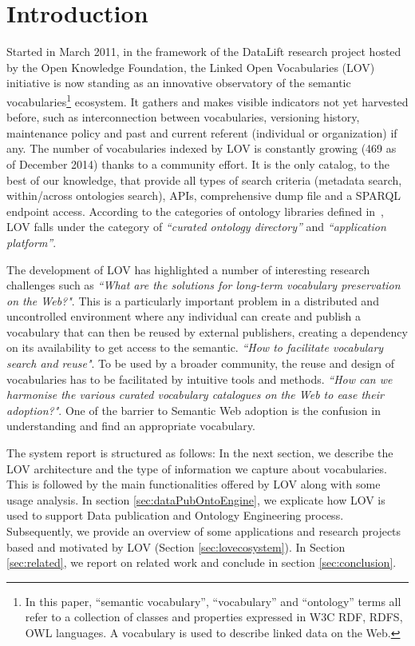 \documentclass{iosart2c}
\begin{document}
\section{Introduction}
Started in March 2011, in the framework of the DataLift research project \cite{scharffe_2012} hosted by the Open Knowledge Foundation, the Linked Open Vocabularies (LOV) initiative is now standing as an innovative observatory of the semantic vocabularies\footnote{In this paper, ``semantic vocabulary'', ``vocabulary'' and ``ontology'' terms all refer to a collection of classes and properties expressed in W3C RDF, RDFS, OWL languages. A vocabulary is used to describe linked data on the Web.} ecosystem. It gathers and makes visible indicators not yet harvested before, such as interconnection between vocabularies, versioning history, maintenance policy and past and current referent (individual or organization) if any. The number of vocabularies indexed by LOV is constantly growing (469 as of December 2014) thanks to a community effort. It is the only catalog, to the best of our knowledge, that provide all types of search criteria (metadata search, within/across ontologies search), APIs, comprehensive dump file and a SPARQL endpoint access. According to the categories of ontology libraries defined in~\cite{AquinJoWS12}, LOV falls under the category of \textit{``curated ontology directory''}  and \textit{``application platform''}.

The development of LOV has highlighted a number of interesting research challenges such as \textit{``What are the solutions for long-term vocabulary preservation on the Web?"}\cite{Baker2013HLT}. This is a particularly important problem in a distributed and uncontrolled environment where any individual can create and publish a vocabulary that can then be reused by external publishers, creating a dependency on its availability to get access to the semantic. \textit{``How to facilitate vocabulary search and reuse"}\cite{butt2014, poveda2012landscape}. To be used by a broader community, the reuse and design of vocabularies has to be facilitated by intuitive tools and methods.  \textit{``How can we harmonise the various curated vocabulary catalogues on the Web to ease their adoption?"}\cite{wasabi13}. One of the barrier to Semantic Web adoption is the confusion in understanding and find an appropriate vocabulary.

The system report is structured as follows: In the next section, we describe the LOV architecture and the type of information we capture about vocabularies. This is followed by the main functionalities offered by LOV along with some usage analysis. In section \ref{sec:dataPubOntoEngine}, we explicate how LOV is used to support Data publication and Ontology Engineering process. Subsequently, we provide an overview of some applications and research projects based and motivated by LOV (Section \ref{sec:lovecosystem}). In Section \ref{sec:related}, we report on related work and conclude in section \ref{sec:conclusion}.
\end{document}

